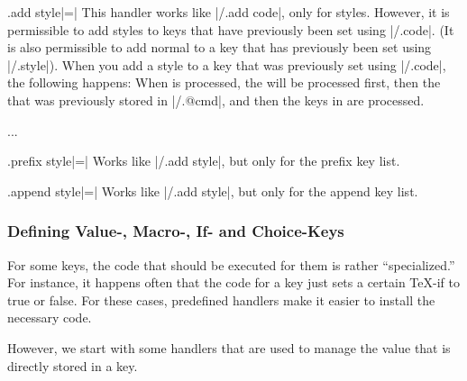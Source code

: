 \begin{handler}{{.add style}|=|}
  This handler works like |/.add code|, only for styles. However, it is
  permissible to add styles to keys that have previously been set
  using  |/.code|. (It is also permissible to add normal  to
  a key that has previously been set using |/.style|). When you add a
  style to a key that was previously set using |/.code|, the following
  happens: When  is processed, the 
  will be processed first, then the  that was previously
  stored in |/.@cmd|, and then the keys in  are processed.
\begin{codeexample}
...
\end{codeexample}
\end{handler}

\begin{handler}{{.prefix style}|=|}
  Works like |/.add style|, but only for the prefix key list.
\end{handler}

\begin{handler}{{.append style}|=|}
  Works like |/.add style|, but only for the append key list.
\end{handler}


\subsubsection{Defining Value-, Macro-, If- and Choice-Keys}

For some keys, the code that should be executed for them is rather
``specialized.'' For instance, it happens often that the code for a
key just sets a certain \TeX-if to true or false. For these cases,
predefined handlers make it easier to install the necessary code.

However, we start with some handlers that are used to manage the value
that is directly stored in a key.

